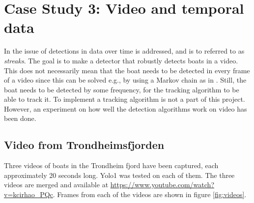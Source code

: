 \newpage

\section{Case Study 3: Video and temporal data}
In \citep{Bohn2018} the issue of detections in data over time is addressed, and is to referred to as \textit{streaks}. The goal is to make a detector that robustly detects boats in a video. This does not necessarily mean that the boat needs to be detected in every frame of a video since this can be solved e.g., by using a Markov chain as in \citep{Markov}. Still, the boat needs to be detected by some frequency, for the tracking algorithm to be able to track it. To implement a tracking algorithm is not a part of this project. However, an experiment on how well the detection algorithms work on video has been done. 

\subsection{Video from Trondheimsfjorden}

Three videos of boats in the Trondheim fjord have been captured, each approximately 20 seconds long. Yolo1 was tested on each of them. The three videos are merged and available at \url{https://www.youtube.com/watch?v=kcirhao_PQc}. Frames from each of the videos are shown in figure \ref{fig:videos}.

